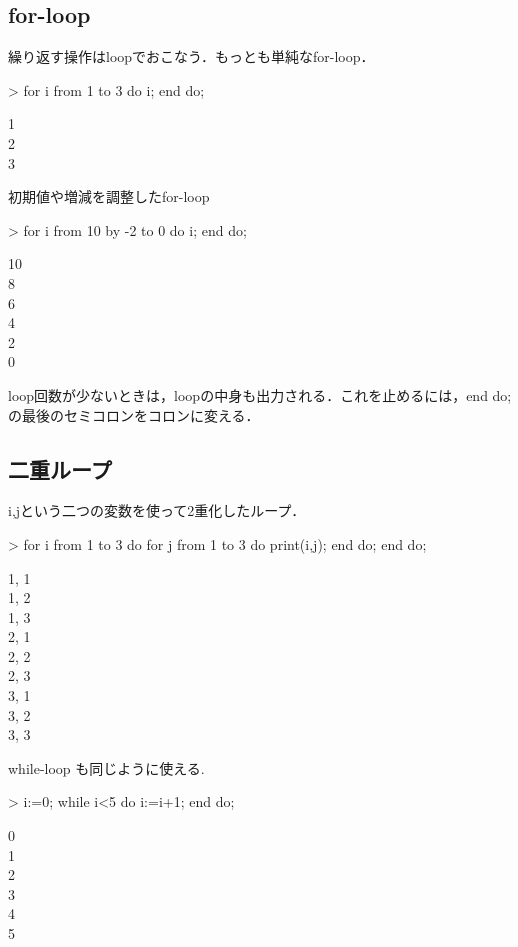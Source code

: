 \subsection{for-loop}
繰り返す操作はloopでおこなう．もっとも単純なfor-loop．
\begin{MapleInput}
> for i from 1 to 3 do 
    i; 
  end do;
\end{MapleInput}
\begin{MapleOutputGather}
1 \notag \\
2 \notag \\
3 \notag
\end{MapleOutputGather}
初期値や増減を調整したfor-loop
\begin{MapleInput}
> for i from 10 by -2 to 0 do
    i; 
  end do;
\end{MapleInput}
\begin{MapleOutputGather}
10 \notag \\
8 \notag \\
6 \notag \\
4 \notag \\
2 \notag \\
0 \notag
\end{MapleOutputGather}
loop回数が少ないときは，loopの中身も出力される．これを止めるには，end do;の最後のセミコロンをコロンに変える．

\subsection{二重ループ}
i,jという二つの変数を使って2重化したループ．
\begin{MapleInput}
> for i from 1 to 3 do 
    for j from 1 to 3 do 
      print(i,j); 
    end do; 
  end do;
\end{MapleInput}
\begin{MapleOutputGather}
1, 1 \notag \\
1, 2 \notag \\
1, 3 \notag \\
2, 1 \notag \\
2, 2 \notag \\
2, 3 \notag \\
3, 1 \notag \\
3, 2 \notag \\
3, 3 \notag
\end{MapleOutputGather}
while-loop も同じように使える.
\begin{MapleInput}
> i:=0; 
  while i<5 do 
    i:=i+1;
  end do;
\end{MapleInput}
\begin{MapleOutputGather}
0 \notag \\
1 \notag \\
2 \notag \\
3 \notag \\
4 \notag \\
5 \notag
\end{MapleOutputGather}
